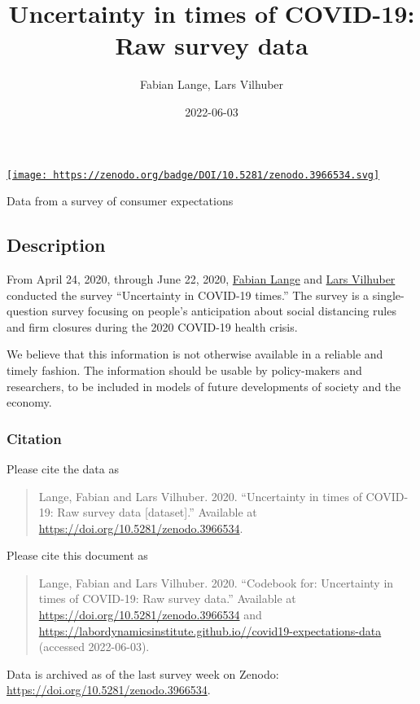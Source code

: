 \documentclass[
]{article}
\title{Uncertainty in times of COVID-19: Raw survey data}
\author{Fabian Lange, Lars Vilhuber}
\date{2022-06-03}
\begin{document}
\maketitle

{
\setcounter{tocdepth}{2}
\tableofcontents
}
\href{https://doi.org/10.5281/zenodo.3966534}{\texttt{[image: https://zenodo.org/badge/DOI/10.5281/zenodo.3966534.svg]}}

Data from a survey of consumer expectations

\hypertarget{description}{%
\subsection{Description}\label{description}}

From April 24, 2020, through June 22, 2020,
\href{http://www.fabianlange.ca/}{Fabian Lange} and
\href{https://lars.vilhuber.com}{Lars Vilhuber} conducted the survey
``Uncertainty in COVID-19 times.'' The survey is a single-question
survey focusing on people's anticipation about social distancing rules
and firm closures during the 2020 COVID-19 health crisis.

We believe that this information is not otherwise available in a
reliable and timely fashion. The information should be usable by
policy-makers and researchers, to be included in models of future
developments of society and the economy.

\hypertarget{citation}{%
\subsubsection{Citation}\label{citation}}

Please cite the data as

\begin{quote}
Lange, Fabian and Lars Vilhuber. 2020. ``Uncertainty in times of
COVID-19: Raw survey data {[}dataset{]}.'' Available at
\url{https://doi.org/10.5281/zenodo.3966534}.
\end{quote}

Please cite this document as

\begin{quote}
Lange, Fabian and Lars Vilhuber. 2020. ``Codebook for: Uncertainty in
times of COVID-19: Raw survey data.'' Available at
\url{https://doi.org/10.5281/zenodo.3966534} and
\url{https://labordynamicsinstitute.github.io//covid19-expectations-data}
(accessed 2022-06-03).
\end{quote}

Data is archived as of the last survey week on Zenodo:
\url{https://doi.org/10.5281/zenodo.3966534}.
\end{document}
